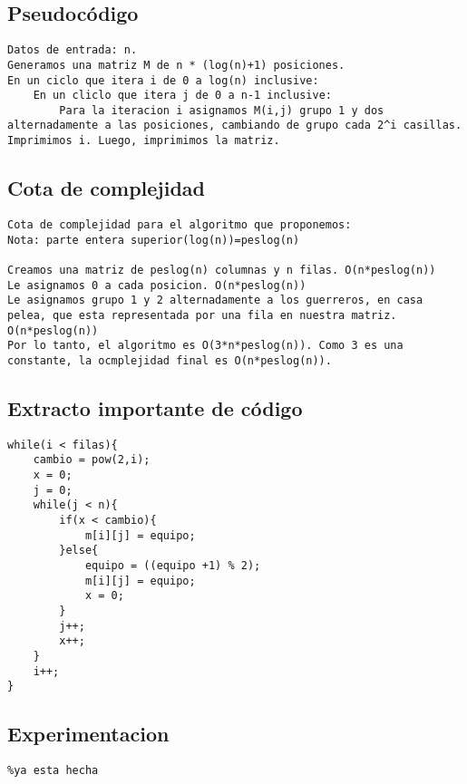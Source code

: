 \documentclass[10pt,a4paper]{article}
\begin{document}
\subsection{Pseudocódigo}
\begin{verbatim}
Datos de entrada: n.
Generamos una matriz M de n * (log(n)+1) posiciones.
En un ciclo que itera i de 0 a log(n) inclusive:
	En un cliclo que itera j de 0 a n-1 inclusive:
		Para la iteracion i asignamos M(i,j) grupo 1 y dos alternadamente a las posiciones, cambiando de grupo cada 2^i casillas.
Imprimimos i. Luego, imprimimos la matriz.
\end{verbatim}

\subsection{Cota de complejidad}
\begin{verbatim}
Cota de complejidad para el algoritmo que proponemos:
Nota: parte entera superior(log(n))=peslog(n)

Creamos una matriz de peslog(n) columnas y n filas. O(n*peslog(n))
Le asignamos 0 a cada posicion. O(n*peslog(n))
Le asignamos grupo 1 y 2 alternadamente a los guerreros, en casa pelea, que esta representada por una fila en nuestra matriz. O(n*peslog(n))
Por lo tanto, el algoritmo es O(3*n*peslog(n)). Como 3 es una constante, la ocmplejidad final es O(n*peslog(n)).
\end{verbatim}

\subsection{Extracto importante de código}
\begin{lstlisting}
while(i < filas){
	cambio = pow(2,i);
	x = 0;
	j = 0;
	while(j < n){
		if(x < cambio){
			m[i][j] = equipo;
		}else{
			equipo = ((equipo +1) % 2);
			m[i][j] = equipo;
			x = 0;
		}
		j++;
		x++;
	}
	i++;
}
\end{lstlisting}

\subsection{Experimentacion}
\begin{verbatim}
%ya esta hecha
\end{verbatim}
\end{document}
